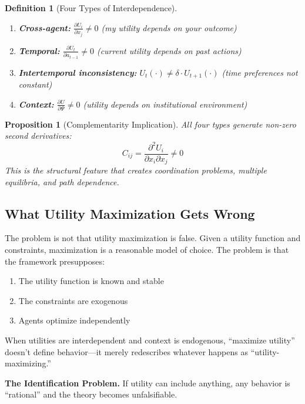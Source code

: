 \documentclass[12pt]{article}
\newtheorem{proposition}{Proposition}
\newtheorem{definition}{Definition}
\begin{document}
\begin{definition}[Four Types of Interdependence]
\begin{enumerate}
    \item \textbf{Cross-agent:} $\frac{\partial U_i}{\partial x_j} \neq 0$ (my utility depends on your outcome)
    \item \textbf{Temporal:} $\frac{\partial U_t}{\partial a_{t-1}} \neq 0$ (current utility depends on past actions)
    \item \textbf{Intertemporal inconsistency:} $U_t(\cdot) \neq \delta \cdot U_{t+1}(\cdot)$ (time preferences not constant)
    \item \textbf{Context:} $\frac{\partial U}{\partial \Psi} \neq 0$ (utility depends on institutional environment)
\end{enumerate}
\end{definition}

\begin{proposition}[Complementarity Implication]
All four types generate non-zero second derivatives:
\begin{equation}
C_{ij} = \frac{\partial^2 U_i}{\partial x_i \partial x_j} \neq 0
\end{equation}
This is the structural feature that creates coordination problems, multiple equilibria, and path dependence.
\end{proposition}

\subsection{What Utility Maximization Gets Wrong}

The problem is not that utility maximization is false. Given a utility function and constraints, maximization is a reasonable model of choice. The problem is that the framework presupposes:
\begin{enumerate}
    \item The utility function is known and stable
    \item The constraints are exogenous
    \item Agents optimize independently
\end{enumerate}

When utilities are interdependent and context is endogenous, ``maximize utility'' doesn't define behavior---it merely redescribes whatever happens as ``utility-maximizing.''

\textbf{The Identification Problem.} If utility can include anything, any behavior is ``rational'' and the theory becomes unfalsifiable.
\end{document}
